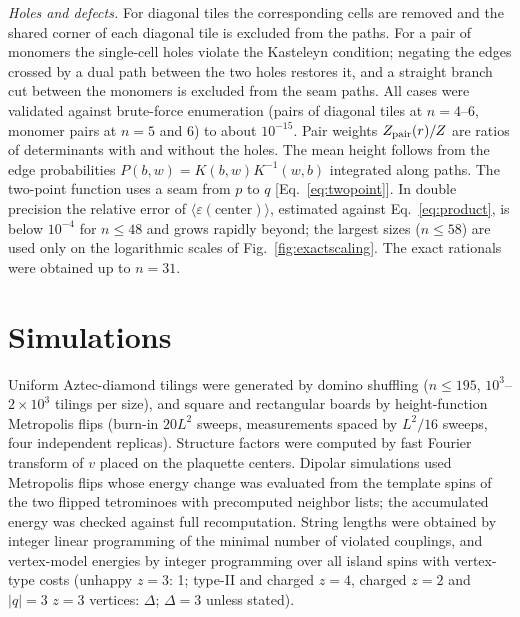\documentclass[aps,prb,twocolumn,floatfix,longbibliography]{revtex4-2}
\newcommand{\eps}{\varepsilon}
\begin{document}
\emph{Holes and defects.} For diagonal tiles the corresponding cells are removed and the shared corner of each diagonal tile is excluded from the paths. For a pair of monomers the single-cell holes violate the Kasteleyn condition; negating the edges crossed by a dual path between the two holes restores it, and a straight branch cut between the monomers is excluded from the seam paths. All cases were validated against brute-force enumeration (pairs of diagonal tiles at $n=4$--6, monomer pairs at $n=5$ and 6) to about $10^{-15}$. Pair weights $Z_{\rm pair}(r)/Z$ are ratios of determinants with and without the holes. The mean height follows from the edge probabilities $P(b,w)=K(b,w)K^{-1}(w,b)$ integrated along paths. The two-point function uses a seam from $p$ to $q$ [Eq.~\eqref{eq:twopoint}]. In double precision the relative error of $\langle\eps(\text{center})\rangle$, estimated against Eq.~\eqref{eq:product}, is below $10^{-4}$ for $n\le48$ and grows rapidly beyond; the largest sizes ($n\le58$) are used only on the logarithmic scales of Fig.~\ref{fig:exactscaling}. The exact rationals were obtained up to $n=31$.

\section{Simulations}
\label{app:sim}

Uniform Aztec-diamond tilings were generated by domino shuffling ($n\le195$, $10^3$--$2\times10^3$ tilings per size), and square and rectangular boards by height-function Metropolis flips (burn-in $20L^2$ sweeps, measurements spaced by $L^2/16$ sweeps, four independent replicas). Structure factors were computed by fast Fourier transform of $v$ placed on the plaquette centers. Dipolar simulations used Metropolis flips whose energy change was evaluated from the template spins of the two flipped tetrominoes with precomputed neighbor lists; the accumulated energy was checked against full recomputation. String lengths were obtained by integer linear programming of the minimal number of violated couplings, and vertex-model energies by integer programming over all island spins with vertex-type costs (unhappy $z=3$: 1; type-II and charged $z=4$, charged $z=2$ and $|q|=3$ $z=3$ vertices: $\Delta$; $\Delta=3$ unless stated).
\end{document}
